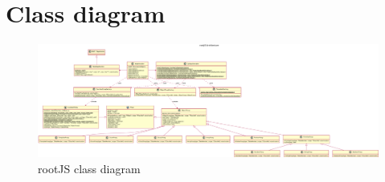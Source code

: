 \section{Class diagram} %

\begin{figure}
	\centering
	\includegraphics[width=\linewidth, height=\textheight, keepaspectratio]{./latex/resources/architecture.pdf}
	\caption{rootJS class diagram}
\end{figure}

\pagebreak
